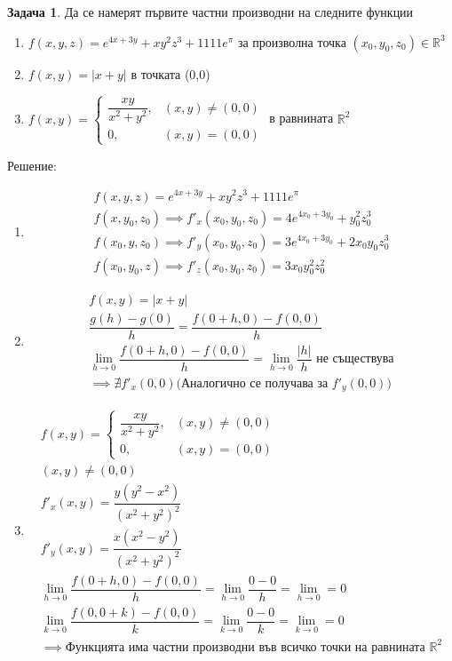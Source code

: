 \documentclass[a4paper,fleqn,12pt]{article}
\theoremstyle{definition}
\newtheorem{task}{Задача}[subsection]
\begin{document}
\begin{task}
Да се намерят първите частни производни на следните функции
\begin{enumerate}

\item $f(x,y,z) = e^{4x+3y} + xy^2z^3 + 1111e^\pi$ за произволна точка $(x_0, y_0, z_0) \in \mathbb{R}^3$
\item $f(x,y) = \vert x + y \vert$ в точката (0,0)
\item $
f(x,y) = 
\begin{cases}
\dfrac{xy}{x^2 + y^2}, & (x,y) \neq (0,0)  \\
0, & (x,y) = (0,0) 
\end{cases}$ в равнината $\mathbb{R}^2$ 
\end{enumerate}
Решение: \\

\begin{enumerate}
\item 
\begin{gather*}
f(x,y,z) = e^{4x+3y} + xy^2z^3 + 1111e^\pi \\
f(x,y_0,z_0) \implies f'_x (x_0,y_0,z_0) = 4e^{4x_0+3y_0} + y_0 ^2 z_0 ^3 \\
f(x_0,y,z_0) \implies f'_y (x_0,y_0,z_0) = 3e^{4x_0+3y_0} + 2x_0 y_0 z_0 ^3 \\
f(x_0,y_0,z) \implies f'_z (x_0,y_0,z_0) = 3x_0 y_0 ^2 z_0 ^2
\end{gather*}

\item 
\begin{gather*}
f(x,y) = \vert x + y \vert \\
\dfrac{g(h) - g(0)}{h} = \dfrac{f(0+h,0) - f(0,0)}{h} \\
\lim\limits_{h \to 0} \dfrac{f(0+h,0) - f(0,0)}{h} = \lim\limits_{h \to 0} \dfrac{\vert h \vert}{h} \text{ не съществува} \\
\implies \nexists f'_x (0,0) \text{(Аналогично се получава за $f'_y(0,0)$)} 
\end{gather*}

\item 
\begin{gather*}
f(x,y) = 
\begin{cases}
\dfrac{xy}{x^2 + y^2}, & (x,y) \neq (0,0)  \\
0, & (x,y) = (0,0) 
\end{cases}\\
(x,y) \neq (0,0)\\
f'_x (x,y) = \dfrac{y(y^2 - x^2)}{(x^2 + y^2)^2}\\
f'_y (x,y) = \dfrac{x(x^2 - y^2)}{(x^2 + y^2)^2}\\
\lim\limits_{h \to 0} \dfrac{f(0+h,0) - f(0,0)}{h} = \lim\limits_{h \to 0} \dfrac{0-0}{h} = \lim\limits_{h \to 0} = 0 \\
\lim\limits_{k \to 0} \dfrac{f(0,0+k) - f(0,0)}{k} =  \lim\limits_{k \to 0} \dfrac{0-0}{k} = \lim\limits_{k \to 0} = 0 \\
\implies  \text{Функцията има частни производни във всичко точки на равнината $\mathbb{R}^2$}
\end{gather*}


\end{enumerate}
\end{task}
\end{document}
